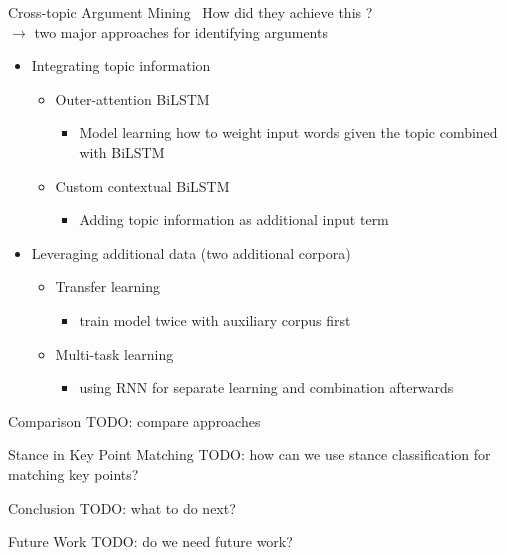 \documentclass[english,handout]{mlutalk}
\begin{document}
\begin{frame}{Cross-topic Argument Mining~\cite{StabMSRG2018}}
  How did they achieve this ?\\
  $\rightarrow$ two major approaches for identifying arguments
  \begin{itemize}
    \item Integrating topic information
    \begin{itemize}
      \item Outer-attention BiLSTM 
      \begin{itemize}
        \item Model learning how to weight input words given the topic combined with BiLSTM
      \end{itemize}
      \item Custom contextual BiLSTM
      \begin{itemize}
        \item Adding topic information as additional input term 
      \end{itemize}
    \end{itemize}
    \item Leveraging additional data (two additional corpora)
    \begin{itemize}
      \item Transfer learning
      \begin{itemize}
        \item train model twice with auxiliary corpus first 
      \end{itemize}
      \item Multi-task learning
      \begin{itemize}
        \item using RNN for separate learning and combination afterwards
      \end{itemize}
    \end{itemize}
  \end{itemize}
\end{frame}

\begin{frame}{Comparison}
  TODO: compare approaches
\end{frame}

\begin{frame}{Stance in Key Point Matching}
  TODO: how can we use stance classification for matching key points?
\end{frame}

\begin{frame}{Conclusion}
  TODO: what to do next?
\end{frame}

\begin{frame}{Future Work}
  TODO: do we need future work?
  \thankyou
\end{frame}

\appendix
\section{\appendixname}

\bibliographyframe
\end{document}
